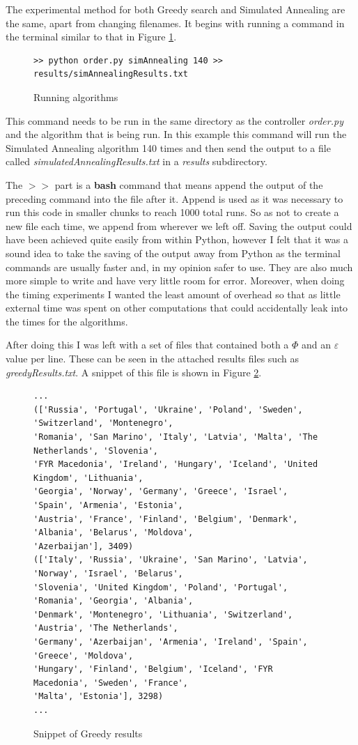 \documentclass[12pt]{report}
\begin{document}
The experimental method for both Greedy search and Simulated Annealing are the same, apart from changing filenames. It begins with running a command in the terminal similar to that in Figure \ref{makeResults}.

\begin{figure}[H]
\caption{Running algorithms}
\label{makeResults}
\begin{verbatim}
>> python order.py simAnnealing 140 >> results/simAnnealingResults.txt
\end{verbatim}
\end{figure}
This command needs to be run in the same directory as the controller \textit{order.py} and the algorithm that is being run. In this example this command will run the Simulated Annealing algorithm 140 times and then send the output to a file called \textit{simulatedAnnealingResults.txt} in a \textit{results} subdirectory. 

The $>>$ part is a \textbf{bash} command that means append the output of the preceding command into the file after it. Append is used as it was necessary to run this code in smaller chunks to reach 1000 total runs. So as not to create a new file each time, we append from wherever we left off. Saving the output could have been achieved quite easily from within Python, however I felt that it was a sound idea to take the saving of the output away from Python as the terminal commands are usually faster and, in my opinion safer to use. They are also much more simple to write and have very little room for error. Moreover, when doing the timing experiments I wanted the least amount of overhead so that as little external time was spent on other computations that could accidentally leak into the times for the algorithms.

After doing this I was left with a set of files that contained both a $\Phi$ and an $\varepsilon$ value per line. These can be seen in the attached results files such as \textit{greedyResults.txt}. A snippet of this file is shown in Figure \ref{greedyResFile}.

\begin{figure}[H]
\caption{Snippet of Greedy results}
\label{greedyResFile}
\begin{verbatim}
...
(['Russia', 'Portugal', 'Ukraine', 'Poland', 'Sweden', 'Switzerland', 'Montenegro',
'Romania', 'San Marino', 'Italy', 'Latvia', 'Malta', 'The Netherlands', 'Slovenia', 
'FYR Macedonia', 'Ireland', 'Hungary', 'Iceland', 'United Kingdom', 'Lithuania', 
'Georgia', 'Norway', 'Germany', 'Greece', 'Israel', 'Spain', 'Armenia', 'Estonia', 
'Austria', 'France', 'Finland', 'Belgium', 'Denmark', 'Albania', 'Belarus', 'Moldova', 
'Azerbaijan'], 3409)
(['Italy', 'Russia', 'Ukraine', 'San Marino', 'Latvia', 'Norway', 'Israel', 'Belarus', 
'Slovenia', 'United Kingdom', 'Poland', 'Portugal', 'Romania', 'Georgia', 'Albania', 
'Denmark', 'Montenegro', 'Lithuania', 'Switzerland', 'Austria', 'The Netherlands', 
'Germany', 'Azerbaijan', 'Armenia', 'Ireland', 'Spain', 'Greece', 'Moldova', 
'Hungary', 'Finland', 'Belgium', 'Iceland', 'FYR Macedonia', 'Sweden', 'France', 
'Malta', 'Estonia'], 3298)
...
\end{verbatim}
\end{figure}
\end{document}
